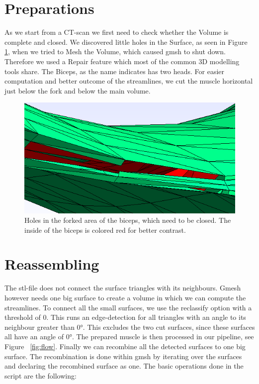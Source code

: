 \documentclass[preprint,journal]{vgtc}       %
\begin{document}
\section{Preparations}
As we start from a CT-scan we first need to check whether the Volume is complete and closed. We discovered little holes in the Surface, as seen  in Figure \ref{fig:holes}, when we tried to Mesh the Volume, which caused gmsh to shut down. Therefore we used a Repair feature which most of the common 3D modelling tools share. 
The Biceps, as the name indicates has two heads. For easier computation and better outcome of the streamlines, we cut  the muscle horizontal just below the fork and below the main volume. 

\begin{figure}
	\begin{center}
		\includegraphics[width = .6\linewidth]{holes.png}
	\end{center}
	\caption{Holes in the forked area of the biceps, which need to be closed. The inside of the biceps is colored red for better contrast.}
	\label{fig:holes}
\end{figure}

\section{Reassembling}
The stl-file does not connect the surface triangles with its neighbours. Gmesh however needs one big surface to create a volume in which we can compute the streamlines. To connect all the small surfaces, we use the reclassify option with a threshold of 0. This runs an edge-detection for all triangles with an angle to its neighbour greater than 0°. This excludes the two cut surfaces, since these surfaces all have an angle of 0°. The prepared muscle is then processed in our pipeline, see Figure ~\ref{fig:flow}. Finally we can recombine all the detected surfaces to one big surface. The recombination is done within gmsh by iterating over the surfaces and declaring the recombined surface as one. The basic operations done in the script are the following:
\end{document}
